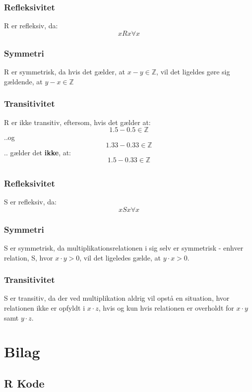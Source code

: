 \documentclass[a4paper,10pt]{article}
\begin{document}
\section{}
\subsection{}
\subsubsection*{Refleksivitet}
R er refleksiv, da:
$$
xRx \forall x
$$

\subsubsection*{Symmetri}
R er symmetrisk, da hvis det gælder, at $x-y \in \mathbb{Z}$, vil det ligeldes gøre sig gældende, at $y-x \in \mathbb{Z}$
\subsubsection*{Transitivitet}
R er ikke transitiv, eftersom, hvis det gælder at:
$$
1.5 - 0.5 \in \mathbb{Z}
$$
..og
$$
1.33 - 0.33 \in \mathbb{Z}
$$
.. gælder det \textbf{ikke}, at:
$$
1.5 - 0.33 \in \mathbb{Z}
$$

\subsection{}
\subsubsection*{Refleksivitet}
S er refleksiv, da:
$$
xSx \forall x
$$

\subsubsection*{Symmetri}
S er symmetrisk, da multiplikationsrelationen i sig selv er symmetrisk - enhver relation, S, hvor $x\cdot y > 0$, vil det ligeledes gælde, at $y\cdot x > 0$.
\subsubsection*{Transitivitet}
S er transitiv, da der ved multiplikation aldrig vil opstå en situation, hvor relationen ikke er opfyldt i $x\cdot z$, hvis og kun hvis relationen er overholdt for $x\cdot y$ samt $y\cdot z$.

\newpage

\section*{Bilag}
\subsection*{R Kode}

\end{document}
